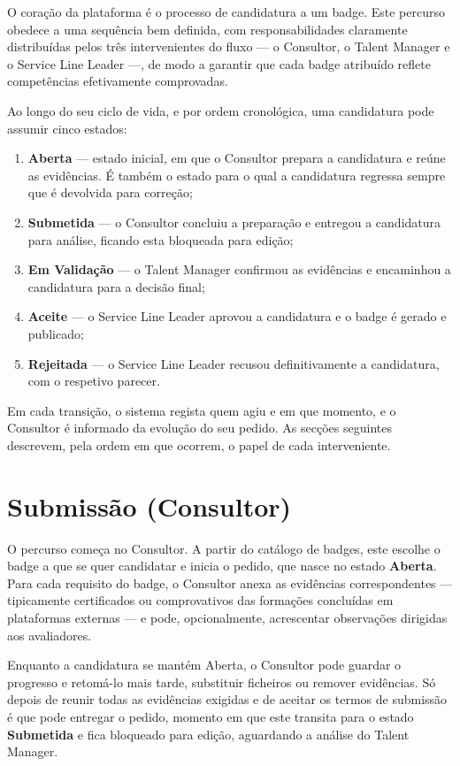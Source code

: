 \documentclass[12pt,a4paper]{report}
\newcommand{\keyword}[1]{\textbf{\color{primary}#1}}
\begin{document}
O coração da plataforma é o processo de candidatura a um badge. Este percurso obedece a uma sequência bem definida, com responsabilidades claramente distribuídas pelos três intervenientes do fluxo --- o Consultor, o Talent Manager e o Service Line Leader ---, de modo a garantir que cada badge atribuído reflete competências efetivamente comprovadas.

Ao longo do seu ciclo de vida, e por ordem cronológica, uma candidatura pode assumir cinco estados:

\begin{enumerate}
  \item \keyword{Aberta} --- estado inicial, em que o Consultor prepara a candidatura e reúne as evidências. É também o estado para o qual a candidatura regressa sempre que é devolvida para correção;
  \item \keyword{Submetida} --- o Consultor concluiu a preparação e entregou a candidatura para análise, ficando esta bloqueada para edição;
  \item \keyword{Em Validação} --- o Talent Manager confirmou as evidências e encaminhou a candidatura para a decisão final;
  \item \keyword{Aceite} --- o Service Line Leader aprovou a candidatura e o badge é gerado e publicado;
  \item \keyword{Rejeitada} --- o Service Line Leader recusou definitivamente a candidatura, com o respetivo parecer.
\end{enumerate}

Em cada transição, o sistema regista quem agiu e em que momento, e o Consultor é informado da evolução do seu pedido. As secções seguintes descrevem, pela ordem em que ocorrem, o papel de cada interveniente.

\section{Submissão (Consultor)}

O percurso começa no Consultor. A partir do catálogo de badges, este escolhe o badge a que se quer candidatar e inicia o pedido, que nasce no estado \keyword{Aberta}. Para cada requisito do badge, o Consultor anexa as evidências correspondentes --- tipicamente certificados ou comprovativos das formações concluídas em plataformas externas --- e pode, opcionalmente, acrescentar observações dirigidas aos avaliadores.

Enquanto a candidatura se mantém Aberta, o Consultor pode guardar o progresso e retomá-lo mais tarde, substituir ficheiros ou remover evidências. Só depois de reunir todas as evidências exigidas e de aceitar os termos de submissão é que pode entregar o pedido, momento em que este transita para o estado \keyword{Submetida} e fica bloqueado para edição, aguardando a análise do Talent Manager.
\end{document}
